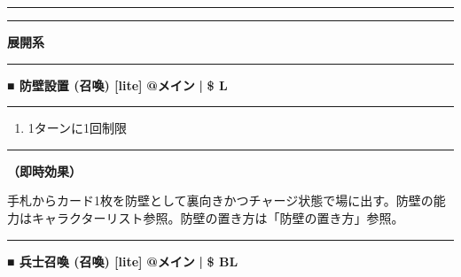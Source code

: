 \documentclass[twocolumn,a5paper,papersize,10pt]{jarticle}
\begin{document}
\begin{center}
\begin{center}
\hrule height 1mm depth 0mm width 66.5mm %
\vspace{1mm}%
{\Large\bf {}}
\vspace{1mm}%
\hrule height 0.5mm depth 0mm width 66.5mm %
\end{center}
\end{center}
\vspace{-1zh}%


\begin{tcolorbox}
{\scriptsize\bf 展開系}
\end{tcolorbox}
\vspace{-1zh}%
\vspace{2mm} %
\hrule height 0.5mm depth 0mm width 66.5mm %
\vspace{1mm} %
{\normalsize\bf ■ 防壁設置 {\scriptsize (召喚) [lite]}} %
\hfill 
{\small\bf @メイン }
  {\small\bf | } {\small\bf \$ L}


\vspace{1mm}%
\hrule height 0.1mm depth 0mm width 66.5mm %
\vspace{1mm}%


\vspace{-1zh}%
\begin{enumerate}
\renewcommand{\labelenumi}{※}
\setlength{\leftskip}{-0.3cm}
\setlength{\itemsep}{0pt} %
\setlength{\parskip}{0pt} %

\item 1ターンに1回制限

\vspace{-3mm}%
\end{enumerate}
\vspace{1mm}%
\hrule height 0.1mm depth 0mm width 66.5mm %
\vspace{1mm}%

{\bf（即時効果）}

手札からカード1枚を防壁として裏向きかつチャージ状態で場に出す。防壁の能力はキャラクターリスト参照。防壁の置き方は「防壁の置き方」参照。
\vspace{2mm} %
\hrule height 0.5mm depth 0mm width 66.5mm %
\vspace{1mm} %
{\normalsize\bf ■ 兵士召喚 {\scriptsize (召喚) [lite]}} %
\hfill 
{\small\bf @メイン }
  {\small\bf | } {\small\bf \$ BL}
\end{document}
